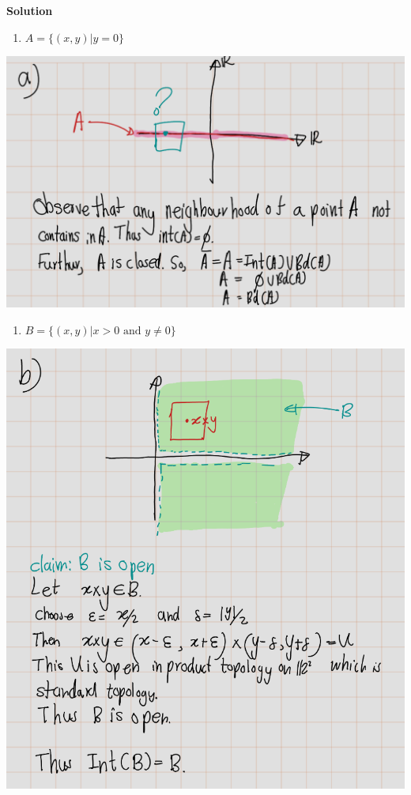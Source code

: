 \documentclass[
]{book}
\providecommand{\tightlist}{%
  \setlength{\itemsep}{0pt}\setlength{\parskip}{0pt}}
\theoremstyle{definition}
\theoremstyle{definition}
\theoremstyle{definition}
\theoremstyle{definition}
\theoremstyle{remark}
\begin{document}
\textbf{Solution}

\begin{enumerate}
\def\labelenumi{(\alph{enumi})}
\tightlist
\item
  \(A = \{(x, y) | y = 0\}\)
\end{enumerate}

\includegraphics{figures/Exercises/Ex 2.17/ex-20-1.png}

\begin{enumerate}
\def\labelenumi{(\alph{enumi})}
\setcounter{enumi}{1}
\tightlist
\item
  \(B = \{(x, y) | x > 0 \text{ and } y \neq 0\}\)
\end{enumerate}

\includegraphics{figures/Exercises/Ex 2.17/ex-20-2.png}
\end{document}
